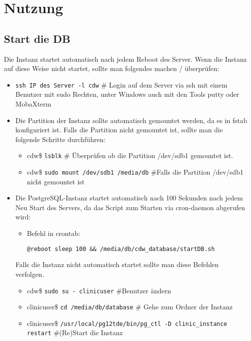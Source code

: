 \chapter{Nutzung}
	   \section{Start die \ac{DB}}
	   Die Instanz startet automatisch nach jedem Reboot des Server. Wenn die Instanz auf diese Weise nicht startet, sollte man folgendes machen / überprüfen:
	   \begin{itemize}
	   	\item \texttt{ssh IP des Server -l cdw} \# Login auf dem Server via ssh mit einem Benutzer mit sudo Rechten, unter Windows auch mit den Tools putty oder MobaXterm
	   	\item Die Partition der Instanz sollte automatisch gemountet werden, da es in fstab konfiguriert ist. Falls die Partition nicht gemountet ist, sollte man die folgende Schritte durchführen:
	   	\begin{itemize}
	   	 \item cdw\$ \texttt{lsblk} \# Überprüfen ob die Partition /dev/sdb1 gemountet ist.
	   	 \item cdw\$ \texttt{sudo mount /dev/sdb1 /media/db} \#Falls die Partition /dev/sdb1 nicht gemountet ist
	   	\end{itemize}	   	  
	   	\item Die PostgreSQL-Instanz startet automatisch nach 100 Sekunden nach jedem Neu Start des Servers, da das Script zum Starten via cron-daemon abgerufen wird:
	   	\begin{itemize}
	   		\item Befehl in crontab: 
	   		
	   		\texttt{@reboot sleep 100 \&\& /media/db/cdw\_database/startDB.sh}
	   	\end{itemize}
	   	Falls die Instanz nicht automatisch startet sollte man diese Befehlen verfolgen.
	   	\begin{itemize}
	   		\item cdw\$ \texttt{sudo su - clinicuser} \#Benutzer ändern
	   		\item clinicuser\$ \texttt{cd /media/db/database} \# Gehe zum Ordner der  Instanz
	   	    \item clinicuser\$ \texttt{/usr/local/pg12tde/bin/pg\_ctl -D clinic\_instance  restart} \#(Re)Start die Instanz
	   	\end{itemize}
	   \end{itemize}
